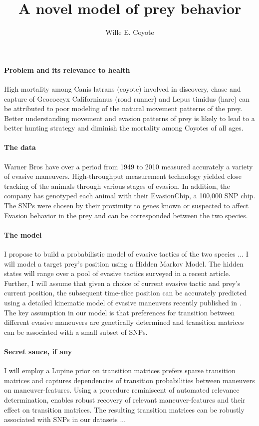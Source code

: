 \documentclass{article}
\title{A novel model of prey behavior}
\author{Wille E. Coyote}
\begin{document}
\maketitle
\paragraph{Problem and its relevance to health}
High mortality among Canis latrans (coyote) involved in discovery, chase and capture of Geococcyx Californianus (road runner) and Lepus timidus
 (hare) can be attributed to poor modeling of the natural movement patterns of the prey. Better understanding movement and evasion patterns of prey is likely to 
lead to a better hunting strategy and diminish the mortality among Coyotes of all ages.

\paragraph{The data}
Warner Bros have over a period from 1949 to 2010 measured accurately a variety of evasive maneuvers. High-throughput measurement technology yielded close tracking of the animals through various stages of evasion. In addition, the company has genotyped each animal with their EvasionChip, a 100,000 SNP chip. The SNPs were chosen by their proximity to genes known or suspected to affect Evasion behavior in the prey and can be corresponded between the two species.

\paragraph{The model}
I propose to build a probabilistic model of evasive tactics of the two species ...
I will model a target prey's position using a Hidden Markov Model. The hidden states will range over a pool of evasive tactics surveyed in a recent article\cite{Baskerville:2011}. Further, I will assume that given a choice of current evasive tactic and prey's current position, the subsequent time-slice position can be accurately predicted using  a detailed kinematic model of evasive maneuvers recently published in \cite{Mangey:2011}. The key assumption in our model is that preferences for transition between different evasive maneuvers are genetically determined and transition matrices can be associated with a small subset of SNPs.

\paragraph{Secret sauce, if any}
I will employ a Lupine prior on transition matrices prefers sparse transition matrices and captures dependencies of transition probabilities between maneuvers on maneuver-features. Using a procedure reminiscent of automated relevance determination, enables robust recovery of relevant maneuver-features and their effect on transition matrices. The resulting transition matrices can be robustly associated with SNPs in our datasets ...
\end{document}
